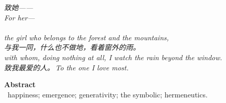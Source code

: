 \documentclass[11pt,a4paper]{article}
\begin{document}
\thispagestyle{empty}
\vspace*{4.5cm}
\begin{center}
\begin{minipage}{0.74\linewidth}
\centering\itshape\color{rose}
{\cjk 致她——}\\[0.3em]
For her---\\[0.7em]
\\[0.2em]
the girl who belongs to the forest and the mountains,\\[0.5em]
{\cjk 与我一同，什么也不做地，看着窗外的雨。}\\[0.2em]
with whom, doing nothing at all, I watch the rain beyond the window.\\[1.0em]
{\upshape\footnotesize\color{gold} {\cjk 致我最爱的人。}\,\;To the one I love most.}
\end{minipage}
\end{center}
\newpage

\thispagestyle{empty}
\noindent\textbf{\large\color{rosedeep} Abstract}\\[0.6em]


\vspace{1.2em}
\, \textcolor{inksoft}{happiness; emergence; generativity; the symbolic; hermeneutics.}
\newpage

\tableofcontents
\newpage



\printbibliography[heading=bibintoc]
\end{document}
